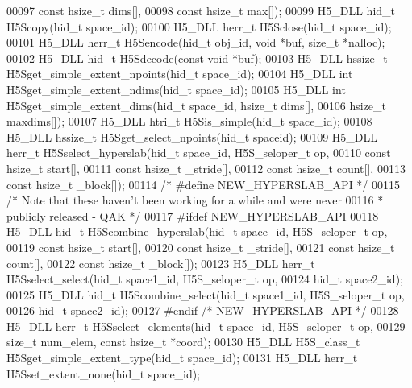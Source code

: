 \begin{DoxyCode}
00097                     \textcolor{keyword}{const} hsize\_t dims[],
00098                     \textcolor{keyword}{const} hsize\_t max[]);
00099 H5\_DLL hid\_t H5Scopy(hid\_t space\_id);
00100 H5\_DLL herr\_t H5Sclose(hid\_t space\_id);
00101 H5\_DLL herr\_t H5Sencode(hid\_t obj\_id, \textcolor{keywordtype}{void} *buf, \textcolor{keywordtype}{size\_t} *nalloc);
00102 H5\_DLL hid\_t H5Sdecode(\textcolor{keyword}{const} \textcolor{keywordtype}{void} *buf);
00103 H5\_DLL hssize\_t H5Sget\_simple\_extent\_npoints(hid\_t space\_id);
00104 H5\_DLL \textcolor{keywordtype}{int} H5Sget\_simple\_extent\_ndims(hid\_t space\_id);
00105 H5\_DLL \textcolor{keywordtype}{int} H5Sget\_simple\_extent\_dims(hid\_t space\_id, hsize\_t dims[],
00106                       hsize\_t maxdims[]);
00107 H5\_DLL htri\_t H5Sis\_simple(hid\_t space\_id);
00108 H5\_DLL hssize\_t H5Sget\_select\_npoints(hid\_t spaceid);
00109 H5\_DLL herr\_t H5Sselect\_hyperslab(hid\_t space\_id, H5S\_seloper\_t op,
00110                    \textcolor{keyword}{const} hsize\_t start[],
00111                    \textcolor{keyword}{const} hsize\_t \_stride[],
00112                    \textcolor{keyword}{const} hsize\_t count[],
00113                    \textcolor{keyword}{const} hsize\_t \_block[]);
00114 \textcolor{comment}{/* #define NEW\_HYPERSLAB\_API */}
00115 \textcolor{comment}{/* Note that these haven't been working for a while and were never}
00116 \textcolor{comment}{ *      publicly released - QAK */}
00117 \textcolor{preprocessor}{#ifdef NEW\_HYPERSLAB\_API}
00118 H5\_DLL hid\_t H5Scombine\_hyperslab(hid\_t space\_id, H5S\_seloper\_t op,
00119                    \textcolor{keyword}{const} hsize\_t start[],
00120                    \textcolor{keyword}{const} hsize\_t \_stride[],
00121                    \textcolor{keyword}{const} hsize\_t count[],
00122                    \textcolor{keyword}{const} hsize\_t \_block[]);
00123 H5\_DLL herr\_t H5Sselect\_select(hid\_t space1\_id, H5S\_seloper\_t op,
00124                                   hid\_t space2\_id);
00125 H5\_DLL hid\_t H5Scombine\_select(hid\_t space1\_id, H5S\_seloper\_t op,
00126                                   hid\_t space2\_id);
00127 \textcolor{preprocessor}{#endif }\textcolor{comment}{/* NEW\_HYPERSLAB\_API */}\textcolor{preprocessor}{}
00128 H5\_DLL herr\_t H5Sselect\_elements(hid\_t space\_id, H5S\_seloper\_t op,
00129     \textcolor{keywordtype}{size\_t} num\_elem, \textcolor{keyword}{const} hsize\_t *coord);
00130 H5\_DLL H5S\_class\_t H5Sget\_simple\_extent\_type(hid\_t space\_id);
00131 H5\_DLL herr\_t H5Sset\_extent\_none(hid\_t space\_id);

\end{DoxyCode}
